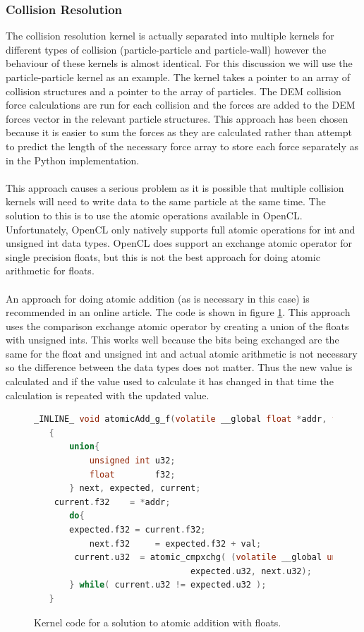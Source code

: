 \documentclass[10pt,a4paper,titlepage]{report}
\begin{document}
\subsubsection{Collision Resolution}
\label{sec:Collision Resolution}
The collision resolution kernel is actually separated into multiple kernels for different types of collision (particle-particle and particle-wall) however the behaviour of these kernels is almost identical. For this discussion we will use the particle-particle kernel as an example. The kernel takes a pointer to an array of collision structures and a pointer to the array of particles. The DEM collision force calculations are run for each collision and the forces are added to the DEM forces vector in the relevant particle structures. This approach has been chosen because it is easier to sum the forces as they are calculated rather than attempt to predict the length of the necessary force array to store each force separately as in the Python implementation.
\\\\This approach causes a serious problem as it is possible that multiple collision kernels will need to write data to the same particle at the same time. The solution to this is to use the atomic operations available in OpenCL. Unfortunately, OpenCL only natively supports full atomic operations for int and unsigned int data types. OpenCL does support an exchange atomic operator for single precision floats, but this is not the best approach for doing atomic arithmetic for floats.
\\\\An approach for doing atomic addition (as is necessary in this case) is recommended in an online article\cite{atomic_addition}.
The code is shown in figure \ref{fig:atomic_float_addition}. This approach uses the comparison exchange atomic operator by creating a union of the floats with unsigned ints. This works well because the bits being exchanged are the same for the float and unsigned int and actual atomic arithmetic is not necessary so the difference between the data types does not matter. Thus the new value is calculated and if the value used to calculate it has changed in that time the calculation is repeated with the updated value.
\begin{figure}[!ht]
\begin{lstlisting}[language=C]
 _INLINE_ void atomicAdd_g_f(volatile __global float *addr, float val)
   {
       union{
           unsigned int u32;
           float        f32;
       } next, expected, current;
   	current.f32    = *addr;
       do{
   	   expected.f32 = current.f32;
           next.f32     = expected.f32 + val;
   		current.u32  = atomic_cmpxchg( (volatile __global unsigned int *)addr, 
                               expected.u32, next.u32);
       } while( current.u32 != expected.u32 );
   }
\end{lstlisting}
\caption{Kernel code for a solution to atomic addition with floats.}
\label{fig:atomic_float_addition}
\end{figure}
\end{document}
